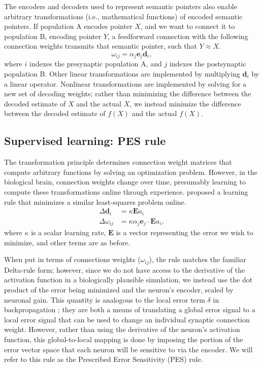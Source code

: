 \documentclass[10pt,letterpaper]{article}
\begin{document}
The encoders and decoders used to represent semantic pointers
also enable arbitrary transformations
(i.e., mathematical functions) of encoded semantic pointers.
If population A encodes pointer $X$,
and we want to connect it to population B, encoding pointer $Y$,
a feedforward connection with the following connection weights
transmits that semantic pointer, such that $Y \approx X$.
\begin{equation}
	\omega_{ij} = \alpha_j \mathbf{e}_j \mathbf{d}_i,
\end{equation}
where $i$ indexes the presynaptic population A,
and $j$ indexes the postsynaptic population B.
Other linear transformations
are implemented by multiplying $\mathbf{d}_i$
by a linear operator.
Nonlinear transformations are implemented
by solving for a new set of decoding weights;
rather than minimizing the difference
between the decoded estimate of $X$ and the actual $X$,
we instead minimize the difference between
the decoded estimate of $f(X)$ and the actual $f(X)$.

\subsection{Supervised learning: PES rule}

The transformation principle determines
connection weight matrices that compute
arbitrary functions by solving an optimization problem.
However, in the biological brain, connection weights
change over time, presumably learning to compute
these transformations online through experience.
 proposed a learning rule
that minimizes a similar least-squares
problem online.
\begin{align}
  \Delta \mathbf{d}_i &= \kappa \mathbf{E} a_i \nonumber \\
  \Delta \omega_{ij} &= \kappa \alpha_j \mathbf{e}_j \cdot \mathbf{E} a_i,
\end{align}
where $\kappa$ is a scalar learning rate,
$\mathbf{E}$ is a vector representing the error we wish to minimize,
and other terms are as before.

When put in terms of connections weights ($\omega_{ij}$),
the rule matches the familiar Delta-rule form;
however, since we do not have access to the
derivative of the activation function
in a biologically plausible simulation,
we instead use the dot product of
the error being minimized and the neuron's encoder,
scaled by neuronal gain.
This quantity is analogous to the local error term
$\delta$ in backpropagation \cite{Rumelhart1986};
they are both a means of translating a global error signal
to a local error signal that can be used to
change an individual synaptic connection weight.
However, rather than using the derivative
of the neuron's activation function,
this global-to-local mapping is done
by imposing the portion of the error vector space
that each neuron will be sensitive to via the encoder.
We will refer to this rule as
the Prescribed Error Sensitivity (PES) rule.
\end{document}
